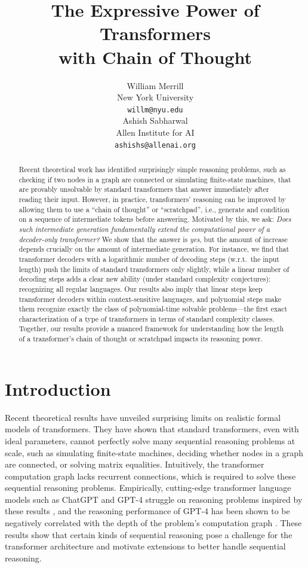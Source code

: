 \documentclass{article}
\title{The Expressive Power of Transformers\\ with Chain of Thought}
\author{%
  William Merrill \\
  New York University\\
  \texttt{willm@nyu.edu} \\
  \And
  Ashish Sabharwal \\
  Allen Institute for AI \\
  \texttt{ashishs@allenai.org} \\
}
\begin{document}
\maketitle

\begin{abstract}
Recent theoretical work has identified surprisingly simple reasoning problems, such as checking if two nodes in a graph are connected or simulating finite-state machines, that are provably unsolvable by standard transformers that answer immediately after reading their input. However, in practice, transformers' reasoning can be improved by allowing them to use a ``chain of thought'' or ``scratchpad'', i.e., generate and condition on a sequence of intermediate tokens before answering. Motivated by this, we ask: \emph{Does such intermediate generation fundamentally extend the computational power of a decoder-only transformer?} We show that the answer is \emph{yes}, but the amount of increase depends crucially on the amount of intermediate generation. For instance, we find that transformer decoders with a logarithmic number of decoding steps (w.r.t.\ the input length) push the limits of standard transformers only slightly, while a linear number of decoding steps adds a clear new ability (under standard complexity conjectures): recognizing all regular languages. Our results also imply that linear steps keep transformer decoders within context-sensitive languages, and polynomial steps make them recognize exactly the class of polynomial-time solvable problems---the first exact characterization of a type of transformers in terms of standard complexity classes. Together, our results provide a nuanced framework for understanding how the length of a transformer’s chain of thought or scratchpad impacts its reasoning power.
\end{abstract}


\section{Introduction}

Recent theoretical results \citep{merrill2023parallelism,merrill2023logic,merrill2022SatAttnTC0,liu2023transformers,chiang2023tighter,hao2022ac0} have unveiled surprising limits on realistic formal models of transformers. They have shown that standard transformers, even with ideal parameters, cannot perfectly solve many sequential reasoning problems at scale, such as simulating finite-state machines, deciding whether nodes in a graph are connected, or solving matrix equalities. Intuitively, the transformer computation graph lacks recurrent connections, which is required to solve these sequential reasoning problems. Empirically, cutting-edge transformer language models such as ChatGPT and GPT-4 struggle on reasoning problems inspired by these results \citep{zhang2023language}, and the reasoning performance of GPT-4 has been shown to be negatively correlated with the depth of the problem's computation graph \citep{dziri2023faith}.
These results show that certain kinds of sequential reasoning pose a challenge for the transformer architecture and motivate extensions to better handle sequential reasoning.
\end{document}
